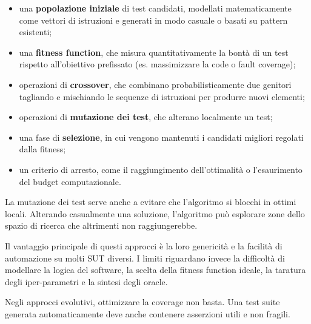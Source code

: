 \begin{itemize}

\item una \textbf{popolazione iniziale} di test candidati, modellati matematicamente come vettori di istruzioni e generati in modo casuale o basati su pattern esistenti;

\item una \textbf{fitness function}, che misura quantitativamente la bontà di un test rispetto all'obiettivo prefissato (es. massimizzare la code o fault coverage);

\item operazioni di \textbf{crossover}, che combinano probabilisticamente due genitori tagliando e mischiando le sequenze di istruzioni per produrre nuovi elementi;

\item operazioni di \textbf{mutazione dei test}, che alterano localmente un test;

\item una fase di \textbf{selezione}, in cui vengono mantenuti i candidati migliori regolati dalla fitness;

\item un criterio di arresto, come il raggiungimento dell'ottimalità o l'esaurimento del budget computazionale.

\end{itemize}

\begin{notaprof}

La mutazione dei test serve anche a evitare che l'algoritmo si blocchi in ottimi locali. Alterando casualmente una soluzione, l'algoritmo può esplorare zone dello spazio di ricerca che altrimenti non raggiungerebbe.

\end{notaprof}

Il vantaggio principale di questi approcci è la loro genericità e la facilità di automazione su molti SUT diversi. I limiti riguardano invece la difficoltà di modellare la logica del software, la scelta della fitness function ideale, la taratura degli iper-parametri e la sintesi degli oracle.

\begin{notaesame}

Negli approcci evolutivi, ottimizzare la coverage non basta. Una test suite generata automaticamente deve anche contenere asserzioni utili e non fragili.

\end{notaesame}

